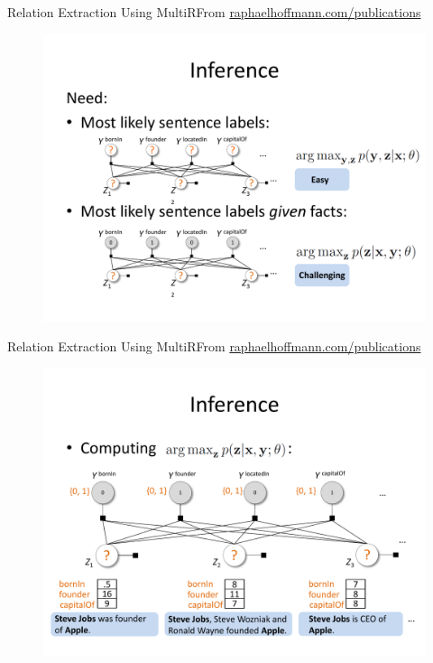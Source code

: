 \documentclass{beamer}
\begin{document}
\begin{frame}{Relation Extraction Using MultiR}{From \url{raphaelhoffmann.com/publications}}
\begin{figure}[h]
 \centering
 \includegraphics[scale=0.40]{./imgs/multirmode3.pdf}
 \end{figure}
\end{frame}
\begin{frame}{Relation Extraction Using MultiR}{From \url{raphaelhoffmann.com/publications}}
\begin{figure}[h]
 \centering
 \includegraphics[scale=0.40]{./imgs/multirmode4.pdf}
 \end{figure}
\end{frame}
\end{document}
